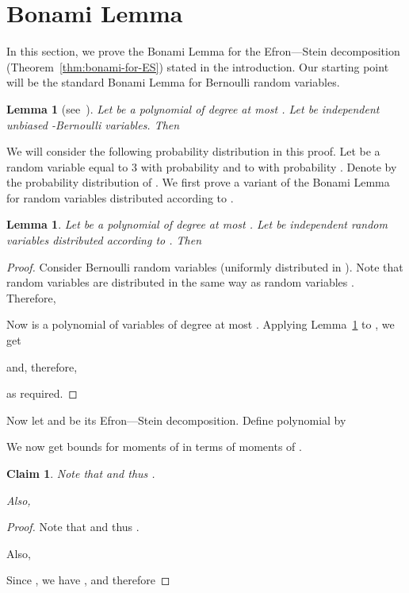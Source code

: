 \documentclass[11pt]{article}
\newtheorem{lemma}[theorem]{Lemma}
\newtheorem{claim}[theorem]{Claim}
\begin{document}
\section{Bonami Lemma} \label{sec:Bonami}
In this section, we prove the Bonami Lemma for the Efron---Stein decomposition (Theorem~\ref{thm:bonami-for-ES}) stated in the introduction.
Our starting point will be the standard Bonami Lemma for Bernoulli  random variables.
\begin{lemma}[see~\cite{Bonami, ODonnell}]\label{lem:bonami-standard}
Let  be a polynomial of degree at most . Let  be independent
unbiased -Bernoulli variables. Then

\end{lemma}

We will consider the following probability distribution in this proof. Let  be a random variable equal to 3 with probability 
and to  with probability . Denote by  the probability distribution of .
We first prove a variant of the Bonami Lemma for random variables distributed according to .
\begin{lemma}\label{lem:bonami-Z}
Let  be a polynomial of degree at most . Let  be independent random variables
distributed according to . Then

\end{lemma}
\begin{proof}
Consider  Bernoulli random variables  (uniformly distributed in ).
Note that random variables  are distributed in the same way as random variables . Therefore,

Now  is a polynomial of  variables  of degree at most .
Applying Lemma~\ref{lem:bonami-standard} to , we get

and, therefore,

as required.
\end{proof}

\noindent Now let  and  be its Efron---Stein decomposition. Define polynomial
 by

We now get bounds for moments of  in terms of moments of .
\begin{claim}\label{claim:second-moment}
Note that  and thus .

Also,

\end{claim}
\begin{proof}
Note that  and thus .

Also,

Since , we have , and therefore

\end{proof}
\end{document}
